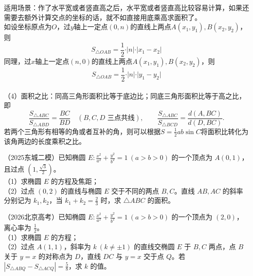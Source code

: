 \begin{center}
\end{center}
适用场景：作了水平宽或者竖直高之后，水平宽或者竖直高比较容易计算，如果还需要去额外计算交点的坐标的话，就不如直接用底乘高求面积了。\\
如设坐标原点为$O$，过$y$轴上一定点$(0, n)$的直线上两点$A(x_1, y_1), B(x_2, y_2)$，则$$S_{\triangle OAB} = \frac{1}{2} \cdot \vert n \vert \cdot \vert x_1 - x_2 \vert$$
同理，过$x$轴上一定点$(n, 0)$的直线上两点$A(x_1, y_1), B(x_2, y_2)$，则$$S_{\triangle OAB} = \frac{1}{2} \cdot \vert n \vert \cdot \vert y_1 - y_2 \vert$$ \\
（4）面积之比：同高三角形面积比等于底边比；同底三角形面积比等于高之比，即
\[
\frac{S_{\triangle ABC}}{S_{\triangle ABD}}=\frac{BC}{BD}\quad(B,C,D\text{ 三点共线}),\qquad
\frac{S_{\triangle ABC}}{S_{\triangle BCD}}=\frac{d(A,BC)}{d(D,BC)}.
\]
若两个三角形有相等的角或者互补的角，则可以根据$S = \frac{1}{2}ab \sin C$将面积比转化为该角两边的长度乘积之比。


\begin{example} %
（2025东城二模）已知椭圆 $E:\frac{x^2}{a^2}+\frac{y^2}{b^2}=1\ (a>b>0)$ 的一个顶点为 $A(0,1)$，且过点 $\left(1,\frac{\sqrt{3}}{2}\right)$。\\
（1）求椭圆 $E$ 的方程及焦距；\\
（2）过点 $(0,2)$ 的直线与椭圆 $E$ 交于不同的两点 $B,C$。直线 $AB,AC$ 的斜率分别记为 $k_1,k_2$，当 $k_1+k_2=\frac{2}{3}$ 时，求 $\triangle ABC$ 的面积。
\end{example}

\begin{example}
（2026北京高考）已知椭圆 $E:\frac{x^2}{a^2}+\frac{y^2}{b^2}=1\ (a>b>0)$ 的一个顶点为 $(2,0)$，离心率为 $\frac{1}{2}$。\\
（1）求椭圆 $E$ 的方程；\\
（2）过点 $A(1,1)$，斜率为 $k\ (k\neq\pm1)$ 的直线交椭圆 $E$ 于 $B,C$ 两点，点 $B$ 关于 $y=x$ 的对称点为 $D$，直线 $DC$ 与 $y=x$ 交于点 $Q$。若
$\left|S_{\triangle ABQ}-S_{\triangle ACQ}\right|=\frac{5}{8}$，求 $k$ 的值。
\end{example}

